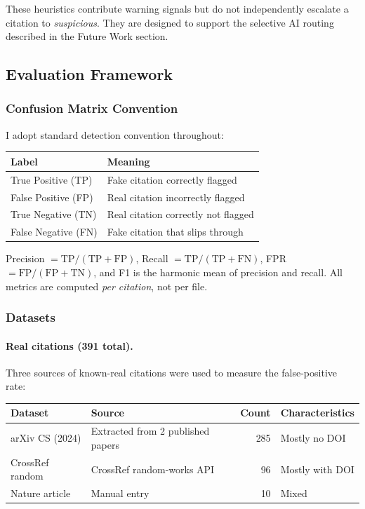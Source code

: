 These heuristics contribute warning signals but do not independently escalate a citation to \textit{suspicious}. They are designed to support the selective AI routing described in the Future Work section.

\subsection{Evaluation Framework}

\subsubsection{Confusion Matrix Convention}

I adopt standard detection convention throughout:

\begin{center}
\begin{tabular}{@{}ll@{}}
\toprule
\textbf{Label} & \textbf{Meaning} \\
\midrule
True Positive (TP)  & Fake citation correctly flagged \\
False Positive (FP) & Real citation incorrectly flagged \\
True Negative (TN)  & Real citation correctly not flagged \\
False Negative (FN) & Fake citation that slips through \\
\bottomrule
\end{tabular}
\end{center}

Precision $= \text{TP}/(\text{TP}+\text{FP})$, Recall $= \text{TP}/(\text{TP}+\text{FN})$, FPR $= \text{FP}/(\text{FP}+\text{TN})$, and F1 is the harmonic mean of precision and recall. All metrics are computed \emph{per citation}, not per file.

\subsubsection{Datasets}

\paragraph{Real citations (391 total).} Three sources of known-real citations were used to measure the false-positive rate:

\begin{center}
\begin{tabular}{@{}llrl@{}}
\toprule
\textbf{Dataset} & \textbf{Source} & \textbf{Count} & \textbf{Characteristics} \\
\midrule
arXiv CS (2024) & Extracted from 2 published papers & 285 & Mostly no DOI \\
CrossRef random  & CrossRef random-works API         &  96 & Mostly with DOI \\
Nature article   & Manual entry                      &  10 & Mixed \\
\bottomrule
\end{tabular}
\end{center}

